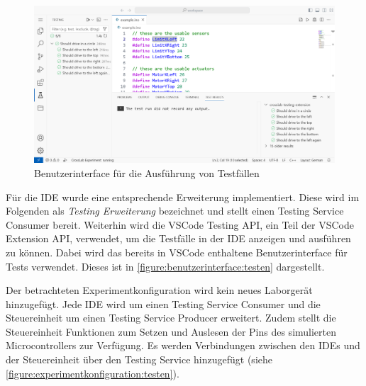 \begin{figure}[tbp]
    \centering
    \includegraphics[trim={0 3px 0 0},clip,width=\textwidth]{images/tests-success.png}
    \caption{Benutzerinterface für die Ausführung von Testfällen}
    \label{figure:benutzerinterface:testen}
\end{figure}

Für die IDE wurde eine entsprechende Erweiterung implementiert. Diese wird im Folgenden als \textit{Testing Erweiterung} bezeichnet und stellt einen Testing Service Consumer bereit. Weiterhin wird die VSCode Testing API, ein Teil der VSCode Extension API, verwendet, um die Testfälle in der IDE anzeigen und ausführen zu können. Dabei wird das bereits in VSCode enthaltene Benutzerinterface für Tests verwendet. Dieses ist in \autoref{figure:benutzerinterface:testen} dargestellt.

Der betrachteten Experimentkonfiguration wird kein neues Laborgerät hinzugefügt. Jede IDE wird um einen Testing Service Consumer und die Steuereinheit um einen Testing Service Producer erweitert. Zudem stellt die Steuereinheit Funktionen zum Setzen und Auslesen der Pins des simulierten Microcontrollers zur Verfügung. Es werden Verbindungen zwischen den IDEs und der Steuereinheit über den Testing Service hinzugefügt (siehe \autoref{figure:experimentkonfiguration:testen}).